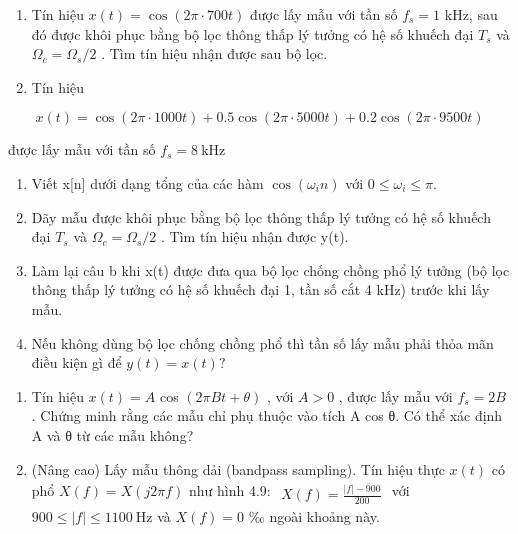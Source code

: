 \documentclass[
  10
]{article}
\begin{document}
\begin{enumerate}
\def\labelenumi{\arabic{enumi}.}
\setcounter{enumi}{2}
\item
  Tín hiệu \(x ( t ) = \cos ( 2 \pi \cdot 7 0 0 t )\) được lấy mẫu với
  tần số \(f _ { s } = 1\) kHz, sau đó được khôi phục bằng bộ lọc thông
  thấp lý tưởng có hệ số khuếch đại \(T _ { s }\) và
  \(\Omega _ { c } = \Omega _ { s } / 2\) . Tìm tín hiệu nhận được sau
  bộ lọc.
\item
  Tín hiệu
\end{enumerate}

\[
x (t) = \cos (2 \pi \cdot 1 0 0 0 t) + 0. 5 \cos (2 \pi \cdot 5 0 0 0 t) + 0. 2 \cos (2 \pi \cdot 9 5 0 0 t)
\]

được lấy mẫu với tần số \(f _ { s } = 8 ~ \mathrm { k H z }\)

\begin{enumerate}
\def\labelenumi{\alph{enumi}.}
\item
  Viết x{[}n{]} dưới dạng tổng của các hàm \(\cos ( \omega _ { i } n )\)
  với \(0 \leq \omega _ { i } \leq \pi .\)
\item
  Dãy mẫu được khôi phục bằng bộ lọc thông thấp lý tưởng có hệ số khuếch
  đại \(T _ { s }\) và \(\Omega _ { c } = \Omega _ { s } / 2\) . Tìm tín
  hiệu nhận được y(t).
\item
  Làm lại câu b khi x(t) được đưa qua bộ lọc chống chồng phổ lý tưởng
  (bộ lọc thông thấp lý tưởng có hệ số khuếch đại 1, tần số cắt 4 kHz)
  trước khi lấy mẫu.
\item
  Nếu không dùng bộ lọc chống chồng phổ thì tần số lấy mẫu phải thỏa mãn
  điều kiện gì để \(y ( t ) = x ( t ) ?\)
\end{enumerate}

\begin{enumerate}
\def\labelenumi{\arabic{enumi}.}
\setcounter{enumi}{4}
\item
  Tín hiệu \(x ( t ) = A\) cos \(( 2 \pi B t + \theta )\) , với
  \(A > 0\) , được lấy mẫu với \(f _ { s } = 2 B\) . Chứng minh rằng các
  mẫu chỉ phụ thuộc vào tích A cos θ. Có thể xác định A và θ từ các mẫu
  không?
\item
  (Nâng cao) Lấy mẫu thông dải (bandpass sampling). Tín hiệu thực
  \(x ( t )\) có phổ \(X ( f ) = X ( j 2 \pi f )\) như hình 4.9:
  \(\begin{array} { r } { X ( f ) = \frac { | f | - \bar { 9 } 0 0 } { 2 0 0 } } \end{array}\)
  với \(9 0 0 \le | f | \le 1 1 0 0 ~ \mathrm { H z }\) và
  \(X ( f ) = 0 \textrm { ‰}\) ngoài khoảng này.
\end{enumerate}
\end{document}
